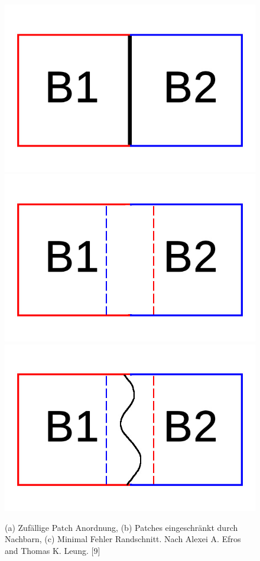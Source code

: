 \documentclass[12pt]{report}
\begin{document}
\begin{figure}[H]
    \centering
    \includegraphics[width=0.25\linewidth]{images/Random-blocks.jpg}%
    \qquad
    \includegraphics[width=0.25\linewidth]{images/overlap-blocks.jpg}%
    \qquad
    \includegraphics[width=0.25\linewidth]{images/minimum-boundary-blocks.jpg}%
    \qquad
    \qquad
    \qquad
    \qquad
    \caption{(a) Zufällige Patch Anordnung, (b) Patches eingeschränkt durch Nachbarn, (c) Minimal Fehler Randschnitt. Nach Alexei A. Efros and Thomas K. Leung. [9]}%
\end{figure}
\end{document}
